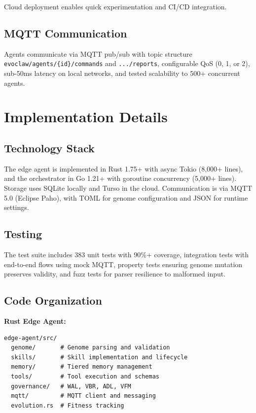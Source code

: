 \documentclass[conference]{IEEEtran}
\begin{document}
Cloud deployment enables quick experimentation and CI/CD integration.

\subsection{MQTT Communication}

Agents communicate via MQTT pub/sub with topic structure \texttt{evoclaw/agents/\{id\}/commands} and \texttt{.../reports}, configurable QoS (0, 1, or 2), sub-50ms latency on local networks, and tested scalability to 500+ concurrent agents.



\section{Implementation Details}
\label{sec:implementation}

\subsection{Technology Stack}

The edge agent is implemented in Rust 1.75+ with async Tokio (8,000+ lines), and the orchestrator in Go 1.21+ with goroutine concurrency (5,000+ lines). Storage uses SQLite locally and Turso in the cloud. Communication is via MQTT 5.0 (Eclipse Paho), with TOML for genome configuration and JSON for runtime settings.

\subsection{Testing}

The test suite includes 383 unit tests with 90\%+ coverage, integration tests with end-to-end flows using mock MQTT, property tests ensuring genome mutation preserves validity, and fuzz tests for parser resilience to malformed input.

\subsection{Code Organization}

\textbf{Rust Edge Agent:}
\begin{lstlisting}[basicstyle=\ttfamily\footnotesize]
edge-agent/src/
  genome/       # Genome parsing and validation
  skills/       # Skill implementation and lifecycle
  memory/       # Tiered memory management
  tools/        # Tool execution and schemas
  governance/   # WAL, VBR, ADL, VFM
  mqtt/         # MQTT client and messaging
  evolution.rs  # Fitness tracking
\end{lstlisting}
\end{document}
